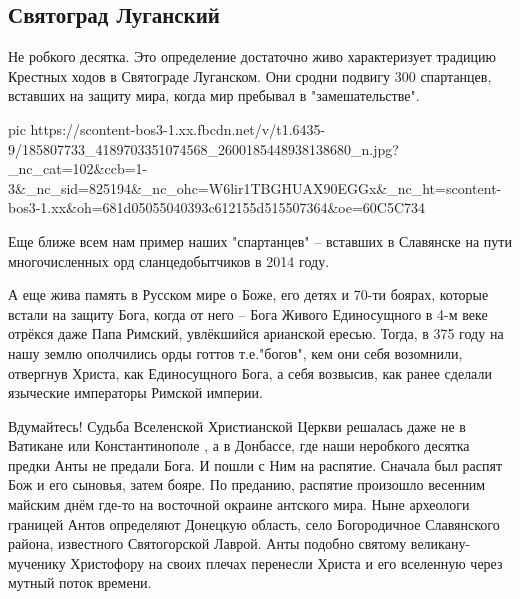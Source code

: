  
 
 
 
 
\subsection{Святоград Луганский}
\label{sec:13_05_2021.fb.lnrgumo.2.bog_donbass_svjatograd}

Не робкого десятка. Это определение достаточно живо характеризует традицию
Крестных ходов в Святограде Луганском.  Они сродни подвигу 300 спартанцев,
вставших на защиту мира, когда мир пребывал в "замешательстве". 

\ifcmt
  pic https://scontent-bos3-1.xx.fbcdn.net/v/t1.6435-9/185807733_4189703351074568_2600185448938138680_n.jpg?_nc_cat=102&ccb=1-3&_nc_sid=825194&_nc_ohc=W6lir1TBGHUAX90EGGx&_nc_ht=scontent-bos3-1.xx&oh=681d05055040393c612155d515507364&oe=60C5C734
\fi


Еще ближе всем нам пример наших "спартанцев" –  вставших в Славянске на пути многочисленных орд сланцедобытчиков в 2014 году. 

А еще  жива память в Русском мире  о  Боже, его детях и 70-ти боярах, которые
встали на защиту Бога, когда от него – Бога Живого Единосущного в 4-м веке
отрёкся даже Папа Римский, увлёкшийся арианской ересью. Тогда, в 375 году на
нашу землю ополчились орды готтов т.е."богов", кем они себя возомнили,
отвергнув Христа, как Единосущного Бога, а себя возвысив, как ранее сделали
языческие императоры Римской империи. 

Вдумайтесь! Судьба Вселенской Христианской Церкви решалась даже не в Ватикане
или Константинополе , а в Донбассе, где наши неробкого десятка предки Анты не
предали Бога.  И пошли с Ним на распятие. Сначала был распят Бож и его сыновья,
затем бояре. По преданию, распятие произошло весенним майским днём где-то на
восточной окраине антского мира. Ныне археологи границей Антов определяют
Донецкую область, село Богородичное Славянского района, известного
Святогорской Лаврой. Анты подобно святому великану-мученику Христофору на своих
плечах перенесли Христа и его вселенную через мутный поток  времени.

